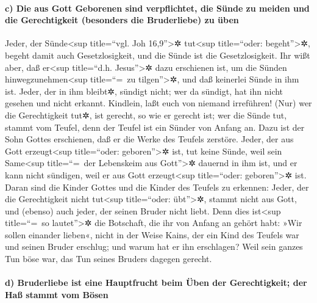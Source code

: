 \hypertarget{c-die-aus-gott-geborenen-sind-verpflichtet-die-suxfcnde-zu-meiden-und-die-gerechtigkeit-besonders-die-bruderliebe-zu-uxfcben}{%
\paragraph{c) Die aus Gott Geborenen sind verpflichtet, die Sünde zu
meiden und die Gerechtigkeit (besonders die Bruderliebe) zu
üben}\label{c-die-aus-gott-geborenen-sind-verpflichtet-die-suxfcnde-zu-meiden-und-die-gerechtigkeit-besonders-die-bruderliebe-zu-uxfcben}}

 Jeder, der Sünde\textless sup title=``vgl. Joh
16,9''\textgreater✲ tut\textless sup title=``oder:
begeht''\textgreater✲, begeht damit auch Gesetzlosigkeit, und die Sünde
ist die Gesetzlosigkeit.  Ihr wißt aber, daß
er\textless sup title=``d.h. Jesus''\textgreater✲ dazu erschienen ist,
um die Sünden hinwegzunehmen\textless sup title=``=~zu
tilgen''\textgreater✲, und daß keinerlei Sünde in ihm ist.
 Jeder, der in ihm bleibt✲, sündigt nicht; wer da sündigt,
hat ihn nicht gesehen und nicht erkannt.  Kindlein, laßt
euch von niemand irreführen! (Nur) wer die Gerechtigkeit tut✲, ist
gerecht, so wie er gerecht ist;  wer die Sünde tut, stammt
vom Teufel, denn der Teufel ist ein Sünder von Anfang an. Dazu ist der
Sohn Gottes erschienen, daß er die Werke des Teufels zerstöre.
 Jeder, der aus Gott erzeugt\textless sup title=``oder:
geboren''\textgreater✲ ist, tut keine Sünde, weil sein Same\textless sup
title=``=~der Lebenskeim aus Gott''\textgreater✲ dauernd in ihm ist, und
er kann nicht sündigen, weil er aus Gott erzeugt\textless sup
title=``oder: geboren''\textgreater✲ ist.  Daran sind die
Kinder Gottes und die Kinder des Teufels zu erkennen: Jeder, der die
Gerechtigkeit nicht tut\textless sup title=``oder: übt''\textgreater✲,
stammt nicht aus Gott, und (ebenso) auch jeder, der seinen Bruder nicht
liebt.  Denn dies ist\textless sup title=``=~so
lautet''\textgreater✲ die Botschaft, die ihr von Anfang an gehört habt:
»Wir sollen einander lieben«,  nicht in der Weise Kains,
der ein Kind des Teufels war und seinen Bruder erschlug; und warum hat
er ihn erschlagen? Weil sein ganzes Tun böse war, das Tun seines Bruders
dagegen gerecht.

\hypertarget{d-bruderliebe-ist-eine-hauptfrucht-beim-uxfcben-der-gerechtigkeit-der-hauxdf-stammt-vom-buxf6sen}{%
\paragraph{d) Bruderliebe ist eine Hauptfrucht beim Üben der
Gerechtigkeit; der Haß stammt vom
Bösen}\label{d-bruderliebe-ist-eine-hauptfrucht-beim-uxfcben-der-gerechtigkeit-der-hauxdf-stammt-vom-buxf6sen}}

